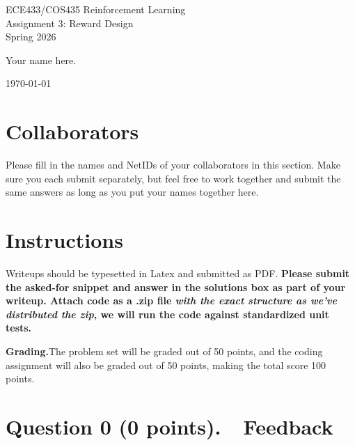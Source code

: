 \documentclass[11pt]{article}
\begin{document}
\begin{center}
{\LARGE ECE433/COS435 Reinforcement Learning \\[4pt]
Assignment 3: Reward Design \\[4pt]
Spring 2026}

\vspace{12pt}
\begin{fillmein}
Your name here.
\end{fillmein}

\vspace{4pt}
\today
\end{center}

\section*{Collaborators}
\begin{fillmein}
Please fill in the names and NetIDs of your collaborators in this section.
Make sure you each submit separately, but feel free to work together and
submit the same answers as long as you put your names together here.
\end{fillmein}

\section*{Instructions}

Writeups should be typesetted in Latex and submitted as PDF.
\textbf{Please submit the asked-for snippet and answer in the solutions box
as part of your writeup.  Attach code as a .zip file
\emph{with the exact structure as we've distributed the zip}, we will run
the code against standardized unit tests.}

\textbf{Grading.}\quad The problem set will be graded out of 50 points,
and the coding assignment will also be graded out of 50 points,
making the total score 100 points.

\section*{Question 0 (0 points).\ \ Feedback}
\end{document}
